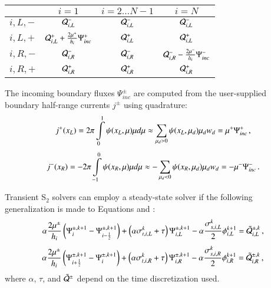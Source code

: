 \begin{center}
\begin{tabular}{|l||c|c|c|}\hline
          & $i=1$ & $i=2\ldots N-1$ & $i=N$\\\hline\hline
  $i,L,-$ & $\mathcal{Q}^-_{i,L}$
          & $\mathcal{Q}^-_{i,L}$
          & $\mathcal{Q}^-_{i,L}$ \\\hline
  $i,L,+$ & $\mathcal{Q}^+_{i,L} + \frac{2\mu^+}{h_i}\Psi^+_{inc}$
          & $\mathcal{Q}^+_{i,L}$
          & $\mathcal{Q}^+_{i,L}$ \\\hline
  $i,R,-$ & $\mathcal{Q}^-_{i,R}$
          & $\mathcal{Q}^-_{i,R}$
          & $\mathcal{Q}^-_{i,R} - \frac{2\mu^-}{h_i}\Psi^-_{inc}$ \\\hline
  $i,R,+$ & $\mathcal{Q}^+_{i,R}$
          & $\mathcal{Q}^+_{i,R}$
          & $\mathcal{Q}^+_{i,R}$ \\\hline
\end{tabular}
\end{center}

The incoming boundary fluxes $\Psi^\pm_{inc}$ are computed from the
user-supplied boundary half-range currents $j^\pm$ using quadrature:
\begin{equation}
   j^+(x_L) = 2\pi\int\limits_0^1 \psi(x_L,\mu)\mu d\mu
   \approx \sum\limits_{\mu_d>0}\psi(x_L,\mu_d)\mu_d w_d
   = \mu^+\Psi^+_{inc} \, ,
\end{equation}
\begin{equation}
   j^-(x_R) = -2\pi\int\limits_{-1}^0 \psi(x_R,\mu)\mu d\mu
   \approx -\sum\limits_{\mu_d<0}\psi(x_R,\mu_d)\mu_d w_d
   = -\mu^-\Psi^-_{inc} \, .
\end{equation}

Transient S$_2$ solvers can employ a steady-state solver if
the following generalization is made to Equations 
and :
\begin{equation}\lequ{S2trL}
  \alpha\frac{2\mu^\pm}{h_i}\fn{\Psi^{\pm,k+1}_i - \Psi^{\pm,k+1}_{i-\half}}
  +\fn{\alpha\sigma_{t,i,L}^k + \tau}\Psi\iL^{\pm,k+1}
  -\alpha\frac{\sigma_{s,i,L}^k}{2}\phi\iL^{k+1}
  =\tilde{\Q}_{i,L}^{\pm,k} \pec
\end{equation}
\begin{equation}\lequ{S2trR}
  \alpha\frac{2\mu^\pm}{h_i}\fn{\Psi^{\pm,k+1}_{i+\half} - \Psi^{\pm,k+1}_i}
  +\fn{\alpha\sigma_{t,i,R}^k + \tau}\Psi\iR^{\pm,k+1}
  -\alpha\frac{\sigma_{s,i,R}^k}{2}\phi\iR^{k+1}
  =\tilde{\Q}_{i,R}^{\pm,k} \pec
\end{equation}
where $\alpha$, $\tau$, and $\tilde{\mathcal{Q}}^\pm$ depend on the time
discretization used.

